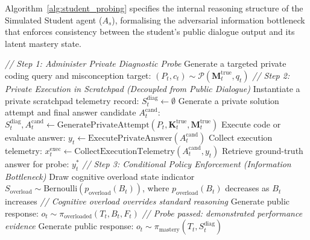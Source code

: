 \documentclass[11pt,a4paper]{report}
\begin{document}
Algorithm~\ref{alg:student_probing} specifies the internal reasoning structure of the Simulated Student agent ($A_s$), formalising the adversarial information bottleneck that enforces consistency between the student's public dialogue output and its latent mastery state.

\begin{algorithm}[p]
\caption{Private Adversarial Scratchpad Probing \& Student Response Selection}
\label{alg:student_probing}
\small
\begin{algorithmic}[1]
\State \textit{// Step 1: Administer Private Diagnostic Probe}
\State Generate a targeted private coding query and misconception target: $(P_t,c_t) \sim \mathcal{P}(\mathbf{M}_t^{\text{true}},q_t)$
\State \textit{// Step 2: Private Execution in Scratchpad (Decoupled from Public Dialogue)}
\State Instantiate a private scratchpad telemetry record: $S_t^{\text{diag}} \gets \emptyset$
\State Generate a private solution attempt and final answer candidate $A^{\text{cand}}_t$:
\State $S_t^{\text{diag}}, A^{\text{cand}}_t \gets \text{GeneratePrivateAttempt}(P_t, \mathbf{K}_t^{\text{true}}, \mathbf{M}_t^{\text{true}})$
\State Execute code or evaluate answer: $y_t \gets \text{ExecutePrivateAnswer}(A^{\text{cand}}_t)$
\State Collect execution telemetry: $x_t^{\text{exec}}\gets\text{CollectExecutionTelemetry}(A^{\text{cand}}_t,y_t)$
\State Retrieve ground-truth answer for probe: $y^*_t$
\State \textit{// Step 3: Conditional Policy Enforcement (Information Bottleneck)}
\State Draw cognitive overload state indicator $S_{\text{overload}} \sim \text{Bernoulli}(p_{\text{overload}}(B_t))$, where $p_{\text{overload}}(B_t)$ decreases as $B_t$ increases
    \State \textit{// Cognitive overload overrides standard reasoning}
    \State Generate public response: $o_t \sim \pi_{\text{overloaded}}(T_t, B_t, F_t)$
\Else
        \State \textit{// Probe passed: demonstrated performance evidence}
        \State Generate public response: $o_t \sim \pi_{\text{mastery}}(T_t, S_t^{\text{diag}})$

\end{algorithmic}
\end{algorithm}
\end{document}

